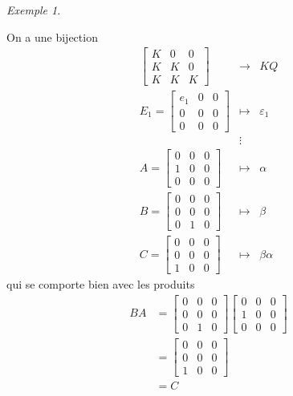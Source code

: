 \documentclass{report}
\theoremstyle{definition}
\theoremstyle{remark}
\newtheorem*{exem}{Exemple}
\begin{document}
\begin{exem}
\begin{enumerate}
			On a une bijection \[ \begin{array}{rcl}
				\begin{bmatrix}
					K&0&0\\
					K&K&0\\
					K&K&K
				\end{bmatrix} &\to& KQ\\
				E_1=\begin{bmatrix}
					e_1&0&0\\
					0&0&0\\
					0&0&0
				\end{bmatrix} &\mapsto& \varepsilon_1\\
				&\vdots\\
				A=\begin{bmatrix}
					0&0&0\\
					1&0&0\\
					0&0&0
				\end{bmatrix} &\mapsto& \alpha\\
				B=\begin{bmatrix}
					0&0&0\\
					0&0&0\\
					0&1&0
				\end{bmatrix} &\mapsto& \beta\\
				C=\begin{bmatrix}
					0&0&0\\
					0&0&0\\
					1&0&0
				\end{bmatrix} &\mapsto& \beta\alpha
			\end{array} \] qui se comporte bien avec les produits
			\begin{align*}
				BA&= \begin{bmatrix}
					0&0&0\\
					0&0&0\\
					0&1&0
				\end{bmatrix} \begin{bmatrix}
					0&0&0\\
					1&0&0\\
					0&0&0
				\end{bmatrix}\\
				&= \begin{bmatrix}
					0&0&0\\
					0&0&0\\
					1&0&0
				\end{bmatrix}\\
				&= C
			\end{align*}
		\end{enumerate}
	\end{exem}
\end{document}
